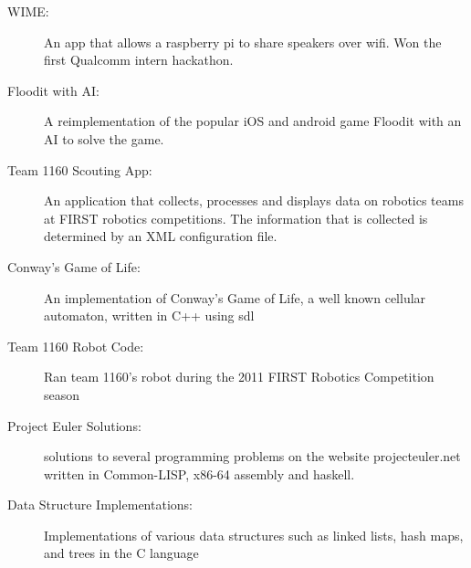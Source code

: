 \documentclass[letterpaper,11pt]{article}
\begin{document}
\begin{description}
\item[WIME:]
  { \footnotesize An app that allows a raspberry pi to share speakers over wifi. Won the first Qualcomm intern hackathon.}
\item[Floodit with AI:]
  { \footnotesize A reimplementation of the popular
    iOS and android game Floodit with an AI to solve the game.}
\item[Team 1160 Scouting App:]
  { \footnotesize An application that collects, processes
    and displays data on robotics teams at
    FIRST robotics competitions. The information that is collected is determined by an XML configuration file.
  }
  \vspace{-1mm}
  
  \item[Conway's Game of Life:]
  { \footnotesize An implementation of Conway's Game of
    Life, a well known cellular automaton, written in
    C++ using sdl
  }
\item[Team 1160 Robot Code:]
  { \footnotesize Ran team 1160's robot
    during the 2011 FIRST Robotics Competition
    season
  }
\item[Project Euler Solutions:]
  { \footnotesize solutions to several programming problems on the
    website projecteuler.net written in Common-LISP, x86-64 assembly and haskell.
  }
\item[Data Structure Implementations:]
  { \footnotesize Implementations of various data structures
    such as linked lists, hash maps, and trees in the
    C language
  }

\end{description} %
\end{document}
